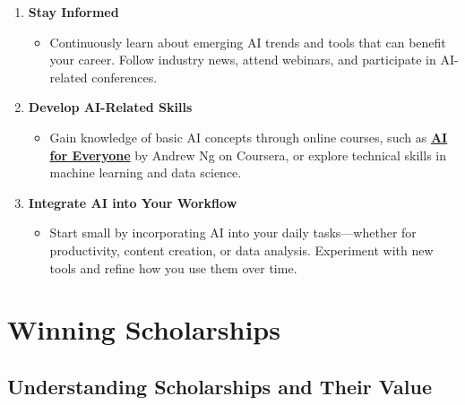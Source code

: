 \documentclass[
  letterpaper,
  DIV=11,
  numbers=noendperiod]{scrreprt}
\providecommand{\tightlist}{%
  \setlength{\itemsep}{0pt}\setlength{\parskip}{0pt}}\usepackage{longtable,booktabs,array}
\begin{document}
\begin{enumerate}
\def\labelenumi{\arabic{enumi}.}
\item
  \textbf{Stay Informed}

  \begin{itemize}
  \tightlist
  \item
    Continuously learn about emerging AI trends and tools that can
    benefit your career. Follow industry news, attend webinars, and
    participate in AI-related conferences.
  \end{itemize}
\item
  \textbf{Develop AI-Related Skills}

  \begin{itemize}
  \tightlist
  \item
    Gain knowledge of basic AI concepts through online courses, such as
    \href{https://www.deeplearning.ai/courses/ai-for-everyone/}{\textbf{AI
    for Everyone}} by Andrew Ng on Coursera, or explore technical skills
    in machine learning and data science.
  \end{itemize}
\item
  \textbf{Integrate AI into Your Workflow}

  \begin{itemize}
  \tightlist
  \item
    Start small by incorporating AI into your daily tasks---whether for
    productivity, content creation, or data analysis. Experiment with
    new tools and refine how you use them over time.
  \end{itemize}
\end{enumerate}


\chapter{Winning Scholarships}\label{winning-scholarships}

\section{Understanding Scholarships and Their
Value}\label{understanding-scholarships-and-their-value}
\end{document}
